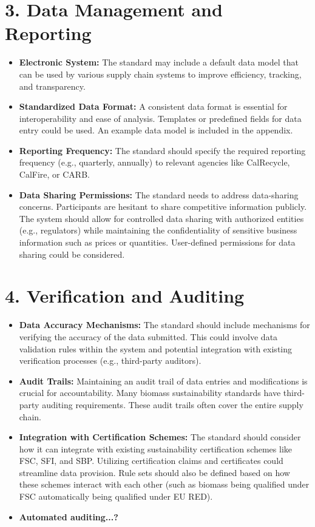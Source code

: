 \documentclass{article}
\begin{document}
\section*{3. Data Management and Reporting}
\begin{itemize}
    \item \textbf{Electronic System:} The standard may include a default data model that can be used by various supply chain systems to improve efficiency, tracking, and transparency. 
    \item \textbf{Standardized Data Format:} A consistent data format is essential for interoperability and ease of analysis. Templates or predefined fields for data entry could be used. An example data model is included in the appendix. 
    \item \textbf{Reporting Frequency:} The standard should specify the required reporting frequency (e.g., quarterly, annually) to relevant agencies like CalRecycle, CalFire, or CARB. 
    \item \textbf{Data Sharing Permissions:} The standard needs to address data-sharing concerns. Participants are hesitant to share competitive information publicly. The system should allow for controlled data sharing with authorized entities (e.g., regulators) while maintaining the confidentiality of sensitive business information such as prices or quantities. User-defined permissions for data sharing could be considered.
\end{itemize}

\section*{4. Verification and Auditing}
\begin{itemize}
    \item \textbf{Data Accuracy Mechanisms:} The standard should include mechanisms for verifying the accuracy of the data submitted. This could involve data validation rules within the system and potential integration with existing verification processes (e.g., third-party auditors).
    \item \textbf{Audit Trails:} Maintaining an audit trail of data entries and modifications is crucial for accountability. Many biomass sustainability standards have third-party auditing requirements. These audit trails often cover the entire supply chain.
    \item \textbf{Integration with Certification Schemes:} The standard should consider how it can integrate with existing sustainability certification schemes like FSC, SFI, and SBP. Utilizing certification claims and certificates could streamline data provision. Rule sets should also be defined based on how these schemes interact with each other (such as biomass being qualified under FSC automatically being qualified under EU RED). 
    \item \textbf{Automated auditing...?}
   \end{itemize}
\end{document}
